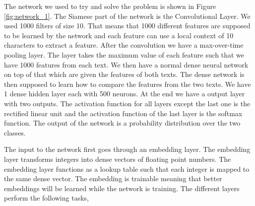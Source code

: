 The network we used to try and solve the problem is shown in Figure
\ref{fig:network_1}. The Siamese part of the network is the Convolutional
Layer. We used 1000 filters of size 10. That means that 1000 different features
are supposed to be learned by the network and each feature can use a local
context of 10 characters to extract a feature. After the convolution we have a
max-over-time pooling layer. The layer takes the maximum value of each feature
such that we have 1000 features from each text. We then have a normal dense
neural network on top of that which are given the features of both texts. The
dense network is then supposed to learn how to compare the features from the two
texts. We have 1 dense hidden layer each with 500 neurons. At the end we have
a output layer with two outputs. The activation function for all layers except
the last one is the rectified linear unit and the activation function of the
last layer is the softmax function. The output of the network is a probability
distribution over the two classes.

The input to the network first goes through an embedding layer. The embedding
layer transforms integers into dense vectors of floating point numbers. The
embedding layer functions as a lookup table such that each integer is mapped
to the same dense vector. The embedding is trainable meaning that better
embeddings will be learned while the network is training. The different layers
perform the following tasks,

